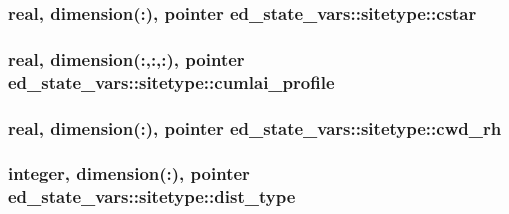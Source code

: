 \subsubsection[{\texorpdfstring{cstar}{cstar}}]{\setlength{\rightskip}{0pt plus 5cm}real, dimension(\+:), pointer ed\+\_\+state\+\_\+vars\+::sitetype\+::cstar}\hypertarget{structed__state__vars_1_1sitetype_a8f8476bdeb16064ac053d5f067be23bc}{}\label{structed__state__vars_1_1sitetype_a8f8476bdeb16064ac053d5f067be23bc}
\subsubsection[{\texorpdfstring{cumlai\+\_\+profile}{cumlai_profile}}]{\setlength{\rightskip}{0pt plus 5cm}real, dimension(\+:,\+:,\+:), pointer ed\+\_\+state\+\_\+vars\+::sitetype\+::cumlai\+\_\+profile}\hypertarget{structed__state__vars_1_1sitetype_aefc82515c0a1f5b524483c98db6690c2}{}\label{structed__state__vars_1_1sitetype_aefc82515c0a1f5b524483c98db6690c2}
\subsubsection[{\texorpdfstring{cwd\+\_\+rh}{cwd_rh}}]{\setlength{\rightskip}{0pt plus 5cm}real, dimension(\+:), pointer ed\+\_\+state\+\_\+vars\+::sitetype\+::cwd\+\_\+rh}\hypertarget{structed__state__vars_1_1sitetype_afab0f8a63deb2b5be089b6708aaa946b}{}\label{structed__state__vars_1_1sitetype_afab0f8a63deb2b5be089b6708aaa946b}
\subsubsection[{\texorpdfstring{dist\+\_\+type}{dist_type}}]{\setlength{\rightskip}{0pt plus 5cm}integer, dimension(\+:), pointer ed\+\_\+state\+\_\+vars\+::sitetype\+::dist\+\_\+type}\hypertarget{structed__state__vars_1_1sitetype_acffb89bf0a94adcc688459f3d1e9092e}{}\label{structed__state__vars_1_1sitetype_acffb89bf0a94adcc688459f3d1e9092e}
